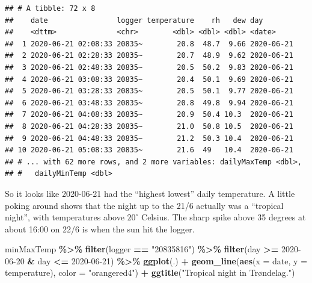 \documentclass[]{article}
\newenvironment{Shaded}{\begin{snugshade}}{\end{snugshade}}
\newcommand{\DataTypeTok}[1]{\textcolor[rgb]{0.13,0.29,0.53}{#1}}
\newcommand{\KeywordTok}[1]{\textcolor[rgb]{0.13,0.29,0.53}{\textbf{#1}}}
\newcommand{\NormalTok}[1]{#1}
\newcommand{\OperatorTok}[1]{\textcolor[rgb]{0.81,0.36,0.00}{\textbf{#1}}}
\newcommand{\StringTok}[1]{\textcolor[rgb]{0.31,0.60,0.02}{#1}}
\begin{document}
\begin{verbatim}
## # A tibble: 72 x 8
##    date                logger temperature    rh   dew day       
##    <dttm>              <chr>        <dbl> <dbl> <dbl> <date>    
##  1 2020-06-21 02:08:33 20835~        20.8  48.7  9.66 2020-06-21
##  2 2020-06-21 02:28:33 20835~        20.7  48.9  9.62 2020-06-21
##  3 2020-06-21 02:48:33 20835~        20.5  50.2  9.83 2020-06-21
##  4 2020-06-21 03:08:33 20835~        20.4  50.1  9.69 2020-06-21
##  5 2020-06-21 03:28:33 20835~        20.5  50.1  9.77 2020-06-21
##  6 2020-06-21 03:48:33 20835~        20.8  49.8  9.94 2020-06-21
##  7 2020-06-21 04:08:33 20835~        20.9  50.4 10.3  2020-06-21
##  8 2020-06-21 04:28:33 20835~        21.0  50.8 10.5  2020-06-21
##  9 2020-06-21 04:48:33 20835~        21.2  50.3 10.4  2020-06-21
## 10 2020-06-21 05:08:33 20835~        21.6  49   10.4  2020-06-21
## # ... with 62 more rows, and 2 more variables: dailyMaxTemp <dbl>,
## #   dailyMinTemp <dbl>
\end{verbatim}

So it looks like 2020-06-21 had the ``highest lowest'' daily
temperature. A little poking around shows that the night up to the 21/6
actually was a ``tropical night'', with temperatures above
\(20^{\circ}\) Celsius. The sharp spike above 35 degrees at about 16:00
on 22/6 is when the sun hit the logger.

\begin{Shaded}
\begin{Highlighting}[]
\NormalTok{minMaxTemp }\OperatorTok{\%>\%}\StringTok{ }
\StringTok{  }\KeywordTok{filter}\NormalTok{(logger }\OperatorTok{==}\StringTok{ "20835816"}\NormalTok{) }\OperatorTok{\%>\%}
\StringTok{  }\KeywordTok{filter}\NormalTok{(day }\OperatorTok{>=}\StringTok{ \textquotesingle{}2020{-}06{-}20\textquotesingle{}} \OperatorTok{\&}
\StringTok{           }\NormalTok{day }\OperatorTok{<=}\StringTok{ \textquotesingle{}2020{-}06{-}21\textquotesingle{}}\NormalTok{) }\OperatorTok{\%>\%}\StringTok{ }
\StringTok{  }\KeywordTok{ggplot}\NormalTok{(.) }\OperatorTok{+}
\StringTok{  }\KeywordTok{geom\_line}\NormalTok{(}\KeywordTok{aes}\NormalTok{(}\DataTypeTok{x =}\NormalTok{ date, }\DataTypeTok{y =}\NormalTok{ temperature), }\DataTypeTok{color =} \StringTok{"orangered4"}\NormalTok{) }\OperatorTok{+}
\StringTok{  }\KeywordTok{ggtitle}\NormalTok{(}\StringTok{"Tropical night in Trøndelag."}\NormalTok{)}
\end{Highlighting}
\end{Shaded}
\end{document}
